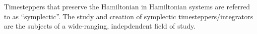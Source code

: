     \begin{example}
        Timesteppers that preserve the Hamiltonian in Hamiltonian systems are referred to as ``symplectic''. The study and creation of symplectic timesteppers/integrators are the subjects of a wide-ranging, indepdendent field of study. \BA{[Ref]}
    \end{example}
    \line

    